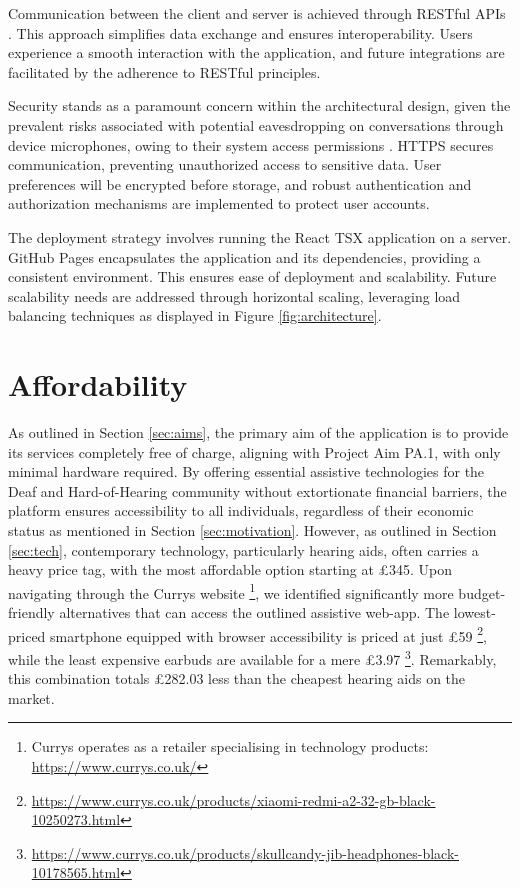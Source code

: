\documentclass{l4proj}
\begin{document}
Communication between the client and server is achieved through RESTful APIs \citep{Red-Hat}. This approach simplifies data exchange and ensures interoperability. Users experience a smooth interaction with the application, and future integrations are facilitated by the adherence to RESTful principles.

Security stands as a paramount concern within the architectural design, given the prevalent risks associated with potential eavesdropping on conversations through device microphones, owing to their system access permissions \citep{kroger2019my}. HTTPS secures communication, preventing unauthorized access to sensitive data. User preferences will be encrypted before storage, and robust authentication and authorization mechanisms are implemented to protect user accounts.

The deployment strategy involves running the React TSX application on a server. GitHub Pages encapsulates the application and its dependencies, providing a consistent environment. This ensures ease of deployment and scalability. Future scalability needs are addressed through horizontal scaling, leveraging load balancing techniques as displayed in Figure \ref{fig:architecture}.

\section{Affordability}
\label{sec:affordability}

As outlined in Section \ref{sec:aims}, the primary aim of the application is to provide its services completely free of charge, aligning with Project Aim PA.1, with only minimal hardware required. By offering essential assistive technologies for the Deaf and Hard-of-Hearing community without extortionate financial barriers, the platform ensures accessibility to all individuals, regardless of their economic status as mentioned in Section \ref{sec:motivation}. However, as outlined in Section \ref{sec:tech}, contemporary technology, particularly hearing aids, often carries a heavy price tag, with the most affordable option starting at £345. Upon navigating through the Currys website \footnote{Currys operates as a retailer specialising in technology products: \url{https://www.currys.co.uk/}}, we identified significantly more budget-friendly alternatives that can access the outlined assistive web-app. The lowest-priced smartphone equipped with browser accessibility is priced at just £59 \footnote{\url{https://www.currys.co.uk/products/xiaomi-redmi-a2-32-gb-black-10250273.html}}, while the least expensive earbuds are available for a mere £3.97 \footnote{\url{https://www.currys.co.uk/products/skullcandy-jib-headphones-black-10178565.html}}. Remarkably, this combination totals £282.03 less than the cheapest hearing aids on the market.
\end{document}
